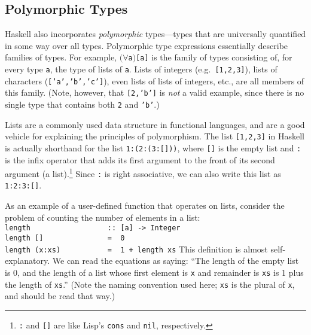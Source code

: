\subsection{Polymorphic Types}
\label{tut-polymorphism}

Haskell also incorporates {\em polymorphic} types---types that are
universally quantified in some way over all types.  Polymorphic
type expressions essentially describe families of types.  For
example, $(\forall$\mbox{\tt a}$)$\mbox{\tt [a]} is the family of types consisting of,
for every type \mbox{\tt a}, the type of lists of \mbox{\tt a}.  Lists of integers
(e.g.~\mbox{\tt [1,2,3]}), lists of characters (\mbox{\tt ['a','b','c']}), even lists of
lists of integers, etc., are all members of this family.  (Note,
however, that \mbox{\tt [2,'b']} is {\em not} a valid example, since there is
no single type that contains both \mbox{\tt 2} and \mbox{\tt 'b'}.)


Lists are a commonly used data structure in functional languages, and
are a good vehicle for explaining the principles of polymorphism.  The
list \mbox{\tt [1,2,3]} in Haskell is actually shorthand for the list
\mbox{\tt 1:(2:(3:[]))}, where \mbox{\tt []} is the empty list and \mbox{\tt :} is the infix
operator that adds its first argument to the front of its second
argument (a list).\footnote{\mbox{\tt :} and \mbox{\tt []} are like Lisp's \mbox{\tt cons} and
\mbox{\tt nil}, respectively.} Since \mbox{\tt :} is right associative, we can also
write this list as \mbox{\tt 1:2:3:[]}.

As an example of a user-defined function that operates on lists,
consider the problem of counting the number of elements in a list:
\bprog
\mbox{\tt length\ \ \ \ \ \ \ \ \ \ \ \ \ \ \ \ \ \ ::\ [a]\ ->\ Integer}\\
\mbox{\tt length\ []\ \ \ \ \ \ \ \ \ \ \ \ \ \ \ =\ \ 0}\\
\mbox{\tt length\ (x:xs)\ \ \ \ \ \ \ \ \ \ \ =\ \ 1\ +\ length\ xs}
\eprog 
This definition is almost self-explanatory.  We can read the equations
as saying: ``The length of the empty list is 0, and the length of a
list whose first element is \mbox{\tt x} and remainder is \mbox{\tt xs} is 1 plus the
length of \mbox{\tt xs}.'' (Note the naming convention used here; \mbox{\tt xs} is the
plural of \mbox{\tt x}, and should be read that way.)

